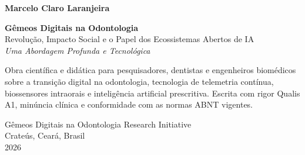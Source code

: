 \begin{folhaderosto}
    \centering
    
    {\large\bfseries Marcelo Claro Laranjeira}\par
    
    \vspace{2cm}
    
    {\Huge\bfseries\color{codeblue} Gêmeos Digitais na Odontologia}\\[0.3cm]
    {\large Revolução, Impacto Social e o Papel dos Ecossistemas Abertos de IA}\\[0.6cm]
    {\large\itshape Uma Abordagem Profunda e Tecnológica}\par
    
    \vspace{1.5cm}
    
    \hfill
    \begin{minipage}{0.45\textwidth}
    \small
    Obra científica e didática para pesquisadores, dentistas 
    e engenheiros biomédicos sobre a transição digital na odontologia, 
    tecnologia de telemetria contínua, biossensores intraorais e 
    inteligência artificial prescritiva. Escrita com rigor 
    Qualis A1, minúncia clínica e conformidade com as normas 
    ABNT vigentes.
    \end{minipage}
    \par
    
    \vspace{1.5cm}
    
    \begin{flushright}
    {\small Gêmeos Digitais na Odontologia Research Initiative}\\[0.1cm]
    {\small Crateús, Ceará, Brasil}\\[0.1cm]
    {\small 2026}
    \end{flushright}
    
    \vspace*{\fill}
\end{folhaderosto}
